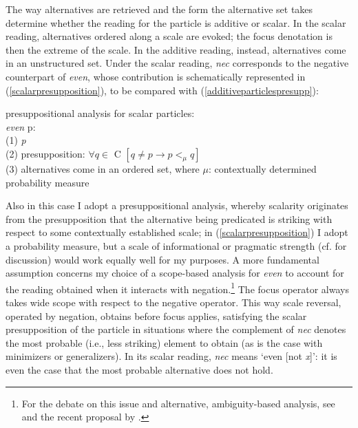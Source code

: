 \documentclass[output=paper]{langsci/langscibook}
\begin{document}
\noindent The way alternatives are retrieved and the form the alternative set takes determine whether the reading for the particle is additive or scalar. In the scalar reading, alternatives ordered along a scale are evoked; the focus denotation is then the extreme of the scale. In the additive reading, instead, alternatives come in an unstructured set. Under the scalar reading, {\emph{nec}} corresponds to the negative counterpart of {\emph{even}}, whose contribution is schematically represented in (\ref{scalarpresupposition}), to be compared with (\ref{additiveparticlespresupp}): %

{\begin{exe}
\ex \label{scalarpresupposition} presuppositional analysis for scalar particles:\\
{\emph{even}} p:\\
(1) {\emph{p}}\\
(2) presupposition: $\forall q \in$ C $[q \neq p \rightarrow p <_{\mu} q]$\\
(3) alternatives come in an ordered set, where ${\mu}$: contextually determined probability measure %
\end{exe}}

\noindent Also in this case I adopt a presuppositional analysis, whereby scalarity originates from the presupposition that the alternative being predicated is striking with respect to some contextually established scale; in (\ref{scalarpresupposition}) I adopt a probability measure, but a scale of informational or pragmatic strength (cf. \citealt{GastAuwera11} for discussion) would work equally well for my purposes. A more fundamental assumption concerns my choice of a scope-based analysis for {\emph{even}} to account for the reading obtained when it interacts with negation.{\footnote{For the debate on this issue and alternative, ambiguity-based analysis, see \citet[]{Rooth85} and the recent proposal by \citet[]{Collins16}.}} The focus operator always takes wide scope with respect to the negative operator. This way scale reversal, operated by negation, obtains before focus applies, satisfying the scalar presupposition of the particle in situations where the complement of {\emph{nec}} denotes the most probable (i.e., less striking) element to obtain (as is the case with minimizers or generalizers). In its scalar reading, {\emph{nec}} means `even [not {\emph{x}}]': it is even the case that the most probable alternative does not hold.
\end{document}

